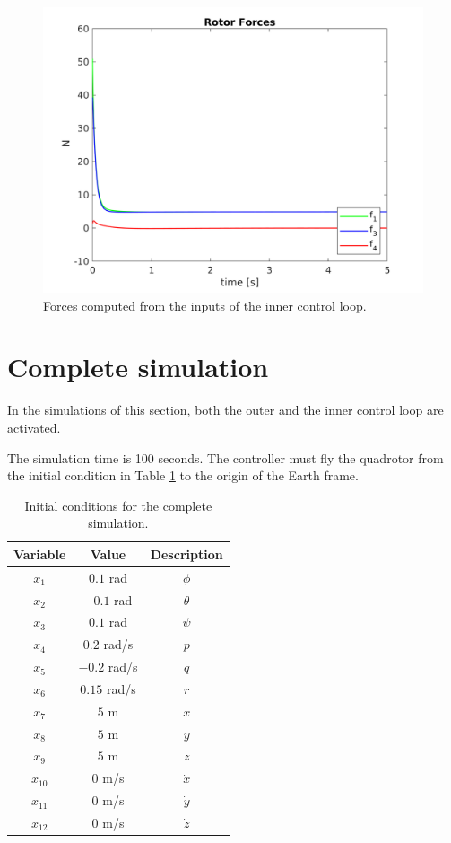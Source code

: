 \documentclass[11pt,a4paper]{scrartcl}
\begin{document}
\begin{figure}
	\centering
	\includegraphics[width=0.7\linewidth]{Images/ForcesInner}
	\caption{Forces computed from the inputs of the inner control loop.}
	\label{fig:forcesiInner}
\end{figure}

\section*{Complete simulation}

In the simulations of this section, both the outer and the inner control loop are activated. 

The simulation time is 100 seconds. The controller must fly the quadrotor from the initial condition in Table \ref{SimulationInit} to the origin of the Earth frame. 

\begin{table}
	\centering
	\begin{tabular}{c c c}
		\toprule
		Variable & Value & Description \\
		\midrule 
		$x_1$  & $0.1$ rad & $\phi$ \\
		$x_2$  & $-0.1$ rad & $\theta$ \\
		$x_3$  & $0.1$ rad & $\psi$ \\
		$x_4$  & $0.2$ rad/s & $p$ \\
		$x_5$  & $-0.2$ rad/s & $q$ \\
		$x_6$  & $0.15$ rad/s & $r$ \\
		$x_7$  & $5$ m & $x$ \\
		$x_8$  & $5$ m & $y$ \\
		$x_9$  & $5$ m & $z$ \\
		$x_{10}$  & $0$ m/s & $\dot{x}$ \\
		$x_{11}$  & $0$ m/s & $\dot{y}$ \\
		$x_{12}$  & $0$ m/s & $\dot{z}$ \\
		\bottomrule
	\end{tabular}
	\caption{Initial conditions for the complete simulation.}
	\label{SimulationInit}
\end{table}
\end{document}
